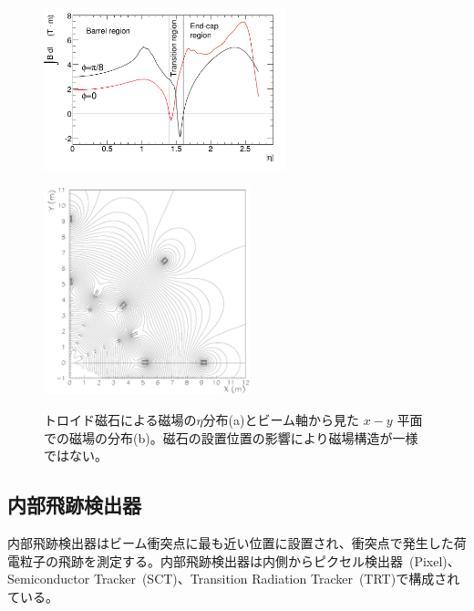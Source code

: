 \begin{figure}
    \centering
    \begin{minipage}[b]{0.4\linewidth}
        \centering
        \includegraphics[clip, width=7cm]{fig/2/IBdl.pdf}
        \vspace{10pt}
        \subcaption{}
        \label{fig:磁場eta}
    \end{minipage}
    \hfill
    \begin{minipage}[b]{0.5\linewidth}
        \centering
        \includegraphics[clip, width=6cm]{fig/2/FMBmap.pdf}
        \vspace{10pt}
        \subcaption{}
        \label{fig:磁場平面}
    \end{minipage}
    \caption{トロイド磁石による磁場の$\eta$分布(a)\cite{Aad:1129811}とビーム軸から見た $x − y$ 平面での磁場の分布(b)\cite{article:ATLASMagneticField}。磁石の設置位置の影響により磁場構造が一様ではない。}
    \label{fig:磁場}
\end{figure}




\subsection{内部飛跡検出器}
内部飛跡検出器はビーム衝突点に最も近い位置に設置され、衝突点で発生した荷電粒子の飛跡を測定する。内部飛跡検出器は内側からピクセル検出器~(Pixel)、Semiconductor Tracker~(SCT)、Transition Radiation Tracker~(TRT)で構成されている。

